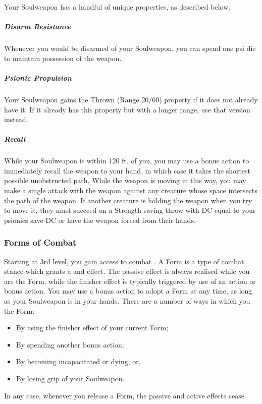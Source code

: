 Your Soulweapon has a handful of unique properties, as described below.

\subparagraph{Disarm Resistance}
Whenever you would be disarmed of your Soulweapon,
you can spend one psi die to maintain possession of the weapon.

\subparagraph{Psionic Propulsion}
Your Soulweapon gains the Thrown (Range 20/60) property if it does not already have it.
If it already has this property but with a longer range, use that version instead.

\subparagraph{Recall}
While your Soulweapon is within 120 ft. of you,
you may use a bonus action to immediately recall the weapon to your hand,
in which case it takes the shortest possible unobstructed path.
While the weapon is moving in this way,
you may make a single attack with the weapon against any creature
whose space intersects the path of the weapon.
If another creature is holding the weapon when you try to move it,
they must succeed on a Strength saving throw with DC equal to your psionics save DC
or have the weapon forced from their hands.

\subsubsection{Forms of Combat}
Starting at 3rd level,
you gain access to combat .
A Form is a type of combat stance which grants a  and  effect.
The passive effect is always realised while you are  the Form,
while the finisher effect is typically triggered by use of an action or bonus action.
You may use a bonus action to adopt a Form at any time,
as long as your Soulweapon is in your hands.
There are a number of ways in which you  the Form:
\begin{itemize}
    \item By using the finisher effect of your current Form;
    \item By spending another bonus action;
    \item By becoming incapacitated or dying; or,
    \item By losing grip of your Soulweapon.
\end{itemize}
In any case, whenever you release a Form, the passive and active effects cease.

